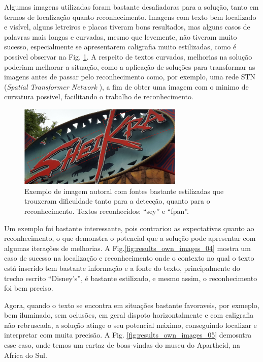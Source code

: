 Algumas imagens utilizadas foram bastante desafiadoras para a solução, tanto em termos de localização quanto reconhecimento. Imagens com texto bem localizado e visível, alguns letreiros e placas tiveram bons resultados, mas alguns casos de palavras mais longas e curvadas, mesmo que levemente, não tiveram muito sucesso, especialmente se apresentarem caligrafia muito estilizadas, como é possivel observar na Fig. \ref{fig:results_own_images_03}. A respeito de textos curvados, melhorias na solução poderiam melhorar a situação, como a aplicação de soluções para transformar as imagens antes de passar pelo reconhecimento como, por exemplo, uma rede STN (\textit{Spatial Transformer Network} \cite{STN}), a fim de obter uma imagem com o minimo de curvatura possivel, facilitando o trabalho de reconhecimento.

\begin{figure}
    \centering
    \includegraphics[width=0.7\textwidth]{figs/resultados-autoral-03.png}
    \caption{Exemplo de imagem autoral com fontes bastante estilizadas que trouxeram dificuldade tanto para a detecção, quanto para o reconhecimento. Textos reconhecidos: “sey” e “fpan”.}
    \label{fig:results_own_images_03}
\end{figure}


Um exemplo foi bastante interessante, pois contrariou as expectativas quanto ao reconhecimento, o que demonstra o potencial que a solução pode apresentar com algumas iterações de melhorias. A Fig.\ref{fig:results_own_images_04} mostra um caso de sucesso na localização e reconhecimento onde o contexto no qual o texto está inserido tem bastante informação e a fonte do texto, principalmente do trecho escrito “Disney’s”, é bastante estilizado, e mesmo assim, o reconhecimento foi bem preciso.


Agora, quando o texto se encontra em situações bastante favoraveis, por exmeplo, bem iluminado, sem oclusões, em geral dispoto horizontalmente e com caligrafia não rebruscada, a solução atinge o seu potencial máximo, conseguindo localizar e interpretar com muita precisão. A Fig. \ref{fig:results_own_images_05} demosntra esse caso, onde temos um cartaz de boas-vindas do museu do Apartheid, na Africa do Sul.

